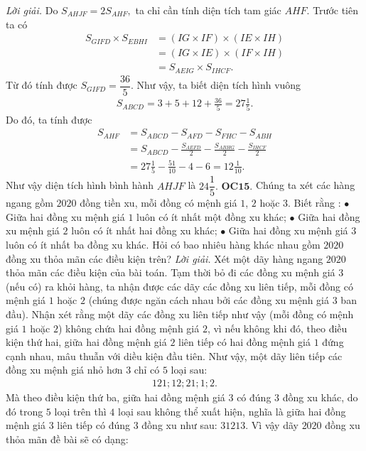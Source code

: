 \begin{multicols}{2}
\begin{figure}[H]
	\end{figure}
	\textit{Lời giải.} Do $S_{AHJF}=2S_{AHF},$ ta chỉ cần tính diện tích tam giác $AHF.$
	\vskip 0.1cm
	Trước tiên ta có
	\begin{align*}
		S_{GIFD}\times S_{EBHI} & = (IG \times IF ) \times (IE\times IH) \\[-0.5ex]
		&= (IG \times IE) \times (IF\times IH )\\[-0.5ex]
		&= S_{AEIG}\times S_{IHCF}.
	\end{align*} 
	Từ đó tính được $S_{GIFD}=\dfrac{36}{5}.$ Như vậy, ta biết diện tích hình vuông
	\begin{align*}
		S_{ABCD}=3+5+12+\frac{36}{5}=27\frac{1}{5}.
	\end{align*}
	Do đó, ta tính được
	\begin{align*}
		S_{AHF}&=S_{ABCD}-S_{AFD}-S_{FHC}-S_{ABH}\\[-0.5ex]
		&=S_{ABCD}-\frac{S_{AEFD}}{2}-\frac{S_{ABHG}}{2}-\frac{S_{IHCF}}{2}\\[-0.5ex]
		&= 27\frac{1}{5} - \frac{51}{10} - 4- 6= 12\frac{1}{10}.
	\end{align*}
	Như vậy diện tích hình bình hành $AHJF$ là $ 24\dfrac{1}{5}.$
	\vskip 0.1cm
	{\bf\color{cackithi} OC$\pmb{15.}$} Chúng ta xét các hàng ngang gồm $2020$ đồng tiền xu, mỗi đồng có mệnh giá $1$, $2$ hoặc $3$. Biết rằng :
	\vskip 0.1cm
	$\bullet$ Giữa hai đồng xu mệnh giá $1$ luôn có ít nhất một đồng xu khác;
	\vskip 0.1cm
	$\bullet$ Giữa hai đồng xu mệnh giá $2$ luôn có ít nhất hai đồng xu khác;
	\vskip 0.1cm
	$\bullet$ Giữa hai đồng xu mệnh giá $3$ luôn có ít nhất ba đồng xu khác.
	\vskip 0.1cm
	Hỏi có bao nhiêu hàng khác nhau gồm $2020$ đồng xu thỏa mãn các điều kiện trên?
	\vskip 0.1cm
	\textit{Lời giải.} Xét một dãy hàng ngang $2020$ thỏa mãn các điều kiện của bài toán. Tạm thời bỏ đi các đồng xu mệnh giá $3$ (nếu có) ra khỏi hàng, ta nhận được các dãy các đồng xu liên tiếp, mỗi đồng có mệnh giá $1$ hoặc $2$ (chúng được ngăn cách nhau bởi các đồng xu mệnh giá $3$ ban đầu).
	\vskip 0.1cm
	Nhận xét rằng một dãy các đồng xu liên tiếp như vậy (mỗi đồng có mệnh giá $1$ hoặc $2$) không chứa hai đồng mệnh giá $2$, vì nếu không khi đó, theo điều kiện thứ hai, giữa hai đồng mệnh giá $2$ liên tiếp có hai đồng mệnh giá $1$ đứng cạnh nhau, mâu thuẫn với diều kiện đầu tiên. Như vậy, một dãy liên tiếp các đồng xu mệnh giá nhỏ hơn $3$ chỉ có $5$ loại sau: 
	\begin{align*}
		121; 12; 21; 1; 2.
	\end{align*} 
	Mà theo điều kiện thứ ba, giữa hai đồng mệnh giá $3$ có đúng $3$ đồng xu khác, do đó trong $5$ loại trên thì $4$ loại sau không thể xuất hiện, nghĩa là giữa hai đồng mệnh giá $3$ liên tiếp có đúng $3$ đồng xu như sau: $31213.$ Vì vậy dãy $2020$ đồng xu thỏa mãn đề bài sẽ có dạng:

\end{multicols}
